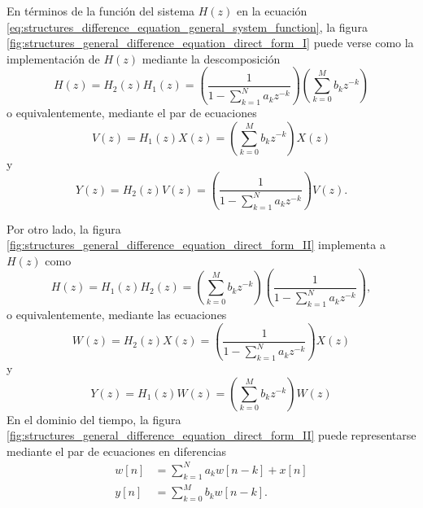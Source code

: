 \documentclass[a4paper]{report}
\begin{document}
En términos de la función del sistema \(H(z)\) en la ecuación \ref{eq:structures_difference_equation_general_system_function}, la figura \ref{fig:structures_general_difference_equation_direct_form_I} puede verse como la implementación de \(H(z)\) mediante la descomposición 
\[
 H(z)=H_2(z)H_1(z)=\left(\dfrac{1}{\displaystyle 1-\sum_{k=1}^N a_kz^{-k}}\right)\left(\sum_{k=0}^M b_kz^{-k}\right)
\]
o equivalentemente, mediante el par de ecuaciones
\[
 V(z)=H_1(z)X(z)=\left(\sum_{k=0}^M b_kz^{-k}\right)X(z)
\]
y
\[
 Y(z)=H_2(z)V(z)=\left(\dfrac{1}{\displaystyle 1-\sum_{k=1}^N a_kz^{-k}}\right)V(z).
\]
 
Por otro lado, la figura \ref{fig:structures_general_difference_equation_direct_form_II} implementa a \(H(z)\) como
\[
 H(z)=H_1(z)H_2(z)=\left(\sum_{k=0}^M b_kz^{-k}\right)\left(\dfrac{1}{\displaystyle 1-\sum_{k=1}^N a_kz^{-k}}\right),
\]
o equivalentemente, mediante las ecuaciones 
\[
 W(z)=H_2(z)X(z)=\left(\dfrac{1}{\displaystyle 1-\sum_{k=1}^N a_kz^{-k}}\right)X(z)
\]
y
\[
 Y(z)=H_1(z)W(z)=\left(\sum_{k=0}^M b_kz^{-k}\right)W(z)
\] 
En el dominio del tiempo, la figura \ref{fig:structures_general_difference_equation_direct_form_II} puede representarse mediante el par de ecuaciones en diferencias
\begin{align*}
 w[n]&=\sum_{k=1}^N a_k w[n-k]+x[n]\\
 y[n]&=\sum_{k=0}^M b_k w[n-k].
\end{align*}
 
\end{document}
